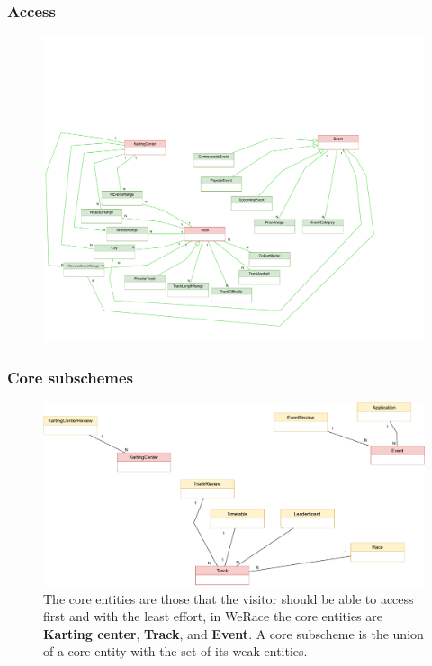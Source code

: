 \documentclass{beamer}
\newcommand{\kc}{WeRace}
\begin{document}
\begin{frame}
    \frametitle{Access}
    \begin{figure}
        \centering
        \includegraphics[width=0.7\linewidth]{drawio/access-subschemes.pdf}
    \end{figure}
\end{frame}


\begin{frame}
    \frametitle{Core subschemes}
    \begin{figure}
        \centering
        \includegraphics[width=1\linewidth]{drawio/core-subschemes-cropped.pdf}
        \caption{
            The core entities are those that the visitor should be able to access first and with the least effort,
            in \kc{} the core entities are \textbf{Karting center}, \textbf{Track}, and \textbf{Event}.
            A core subscheme is the union of a core entity with the set of its weak entities.            
        }
    \end{figure}
\end{frame}
\end{document}
